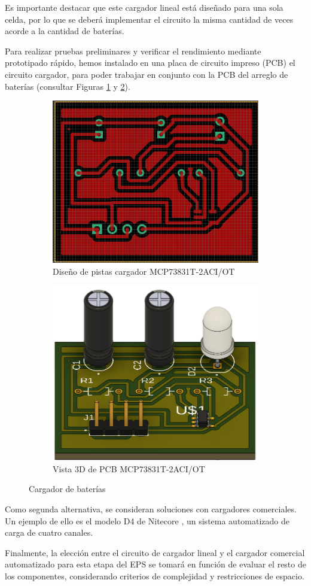 Es importante destacar que este cargador lineal está diseñado para una sola celda, por lo que se deberá implementar el circuito la misma cantidad de veces acorde a la cantidad de baterías.

Para realizar pruebas preliminares y verificar el rendimiento mediante prototipado rápido, hemos instalado en una placa de circuito impreso (PCB) el circuito cargador, para poder trabajar en conjunto con la PCB del arreglo de baterías (consultar Figuras \ref{fig:Chargerpistas} y \ref{fig:Charger3d}).

\begin{figure}
  \centering
  \begin{subfigure}{\linewidth}
    \centering
    \includegraphics[width=0.4\linewidth]{Pictures/DesignPCBCharger.png}
    \caption{Diseño de pistas cargador MCP73831T-2ACI/OT}
    \label{fig:Chargerpistas}
  \end{subfigure}
  \begin{subfigure}{\linewidth}
    \centering
    \includegraphics[width=0.4\linewidth]{Pictures/DesignPCBCharger3d.png}
    \caption{Vista 3D de PCB MCP73831T-2ACI/OT}
    \label{fig:Charger3d}
  \end{subfigure}
  \caption{Cargador de baterías}
  \label{fig:CHARGER-subfiguras}
\end{figure}

Como segunda alternativa, se consideran soluciones con cargadores comerciales. Un ejemplo de ello es el modelo D4 de Nitecore \cite{nitecore-d4-charger}, un sistema automatizado de carga de cuatro canales.

Finalmente, la elección entre el circuito de cargador lineal y el cargador comercial automatizado para esta etapa del EPS se tomará en función de evaluar el resto de los componentes, considerando criterios de complejidad y restricciones de espacio.


